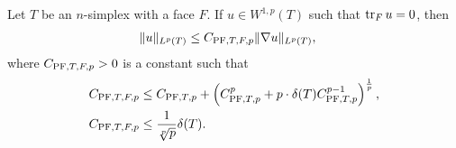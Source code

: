 \documentclass[10pt,letterpaper]{article}
\begin{document}
\begin{lemma}\label{lemma:mixedbconsimplex}
    Let $T$ be an $n$-simplex with a face $F$. 
    If $u \in W^{1,p}(T)$ such that $\operatorname{tr}_{F} u = 0$, then 
    \begin{align*}
        \| u \|_{L^{p}(T)}
        &
        \leq 
        C_{{\rm PF},T,F,p} \| \nabla u \|_{L^{p}(T)}
        ,
    \end{align*}
    where $C_{{\rm PF},T,F,p} > 0$ is a constant such that 
    \begin{align*}
        C_{{\rm PF},T,F,p}
        &\leq 
        C_{{\rm PF},T,p} + \left( C_{{\rm PF},T,p}^{p} + p \cdot {\delta}(T) C_{{\rm PF},T,p}^{p-1} \right)^{\frac 1 p},  
        \\
        C_{{\rm PF},T,F,p}
        &\leq
        \frac{1}{\sqrt[p]{p}}
        {\delta}(T)
        .
    \end{align*}
\end{lemma}
\end{document}
